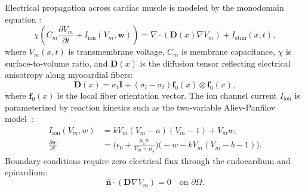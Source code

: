 Electrical propagation across cardiac muscle is modeled by the monodomain
equation \cite{keener2009mathematical}:
\begin{equation}
  \label{eq:monodomain}
  \chi \left( C_m \frac{\partial V_m}{\partial t} + I_{\text{ion}}(V_m, \mathbf{w}) \right) = \nabla \cdot (\mathbf{D}(x) \nabla V_m) + I_{\text{stim}}(x, t),
\end{equation}
where $V_m(x, t)$ is transmembrane voltage, $C_m$ is membrane capacitance, $\chi$ is surface-to-volume ratio, and $\mathbf{D}(x)$ is the diffusion tensor reflecting electrical anisotropy along myocardial fibers:
\begin{equation}
  \label{eq:ch35-dtensor}
  \mathbf{D}(x) = \sigma_t \mathbf{I} + (\sigma_l - \sigma_t) \mathbf{f}_0(x) \otimes \mathbf{f}_0(x),
\end{equation}
where $\mathbf{f}_0(x)$ is the local fiber orientation vector. The ion channel current $I_{\text{ion}}$ is parameterized by reaction kinetics such as the two-variable Aliev-Panfilov model~\cite{aliev1996simple}:
\begin{align}
  \label{eq:ch35-ion}
  I_{\text{ion}}(V_m, w) &= k V_m (V_m - a)(V_m - 1) + V_m w, \\
  \label{eq:ch35-recovery}
  \frac{\partial w}{\partial t} &= \big( \epsilon_0 + \frac{\mu_1 w}{V_m + \mu_2} \big) \big( -w - k V_m (V_m - b - 1) \big).
\end{align}
Boundary conditions require zero electrical flux through the endocardium and epicardium:
\begin{equation}
  \label{eq:ch35-no-flux}
  \hat{\mathbf{n}} \cdot (\mathbf{D} \nabla V_m) = 0 \quad \text{on } \partial\Omega.
\end{equation}

